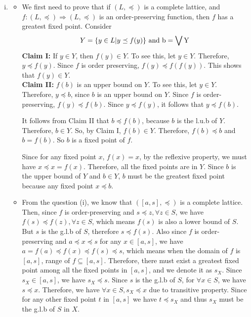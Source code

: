 \documentclass{article}[12pt]
\begin{document}
\begin{enumerate}[(i)]
\item \begin{itemize}
\item We first need to prove that if $(L,\preceq)$ is a complete lattice, and $f:(L,\preceq)\Rightarrow (L,\preceq )$ is an order-preserving function, then $f$ has a greatest fixed point. Consider 
\begin{align*}
Y=\{y\in L| y\preceq f(y)\}\ \rm{and}\ b=\bigvee Y
\end{align*}
\textbf{Claim I:} If $y\in Y$, then $f(y)\in Y$. To see this, let $y\in Y$. Therefore, $y\preceq f(y)$. Since $f$ is order preserving, $f(y)\preceq f(f(y))$. This shows that $f(y)\in Y$.\\
\textbf{Claim II:} $ f(b) $ is an upper bound on $Y$. To see this, let $y\in Y$. Therefore, $y\preceq b$, since $b$ is an upper bound on $Y$. Since $f$ is order-preserving, $f(y)\preceq f(b)$. Since $y\preceq f(y)$, it follows that $y\preceq f(b)$. \par
It follows from Claim II that $b\preceq f(b)$, because $b$ is the l.u.b of $Y$. Therefore, $b\in Y$. So, by Claim I, $f(b)\in Y$. Therefore, $f(b)\preceq b$ and $b=f(b)$. So $b$ is a fixed point of $f$.\par 
Since for any fixed point $x$, $f(x)=x$, by the reflexive property, we must have $x\preceq x =f(x)$. Therefore, all the fixed points are in $Y$. Since $b$ is the upper bound of $Y$ and $b\in Y$, $b$ must be the greatest fixed point because any fixed point $x\preceq b$.
\item From the question (i), we know that $([a,s],\preceq)$ is a complete lattice. Then, since $f$ is order-preserving and $s\preceq z,\forall z\in S$, we have $f(s)\preceq f(z),\forall z\in S$, which means $f(s)$ is also a lower bound of $S$. But $s$ is the g.l.b of $S$, therefore $s\preceq f(s)$. Also since $f$ is order-preserving and $a\preceq x\preceq s$ for any $x\in[a,s]$, we have $a=f(a)\preceq f(x)\preceq  f(s)\preceq s$, which means when the domain of $f$ is $[a,s]$, range of $f \subseteq [a,s]$.
Therefore, there must exist a greatest fixed point among all the fixed points in $[a,s]$, and we denote it as $s_X$. Since $s_X\in [a,s]$, we have $s_X\preceq s$. Since $s$ is the g.l.b of $S$, for $\forall x\in S$, we have $s\preceq x$. Therefore, we have $\forall x\in S, s_X\preceq x$ due to transitive property. Since for any other fixed point $t$ in $[a,s]$ we have $t\preceq s_X$ and thus $s_X$ must be the g.l.b of $S$ in $X$. 

\end{itemize}
\end{enumerate}
\end{document}

